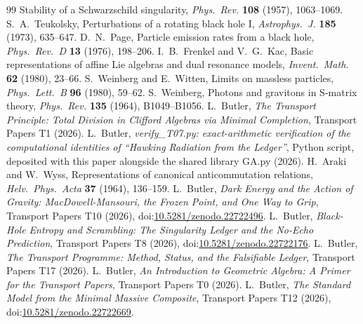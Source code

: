 \documentclass[11pt]{article}
\theoremstyle{definition}
\theoremstyle{plain}
\begin{document}
\begin{thebibliography}{99}
Stability of a Schwarzschild singularity,
\emph{Phys.\ Rev.} \textbf{108} (1957), 1063--1069.
 S.~A.~Teukolsky,
Perturbations of a rotating black hole I,
\emph{Astrophys.\ J.} \textbf{185} (1973), 635--647.
 D.~N.~Page,
Particle emission rates from a black hole,
\emph{Phys.\ Rev.\ D} \textbf{13} (1976), 198--206.
 I.~B.~Frenkel and V.~G.~Kac,
Basic representations of affine Lie algebras and dual resonance models,
\emph{Invent.\ Math.} \textbf{62} (1980), 23--66.
 S.~Weinberg and E.~Witten,
Limits on massless particles,
\emph{Phys.\ Lett.\ B} \textbf{96} (1980), 59--62.
 S.~Weinberg,
Photons and gravitons in S-matrix theory,
\emph{Phys.\ Rev.} \textbf{135} (1964), B1049--B1056.
 L.~Butler,
\emph{The Transport Principle: Total Division in Clifford Algebras via Minimal Completion},
Transport Papers T1 (2026).
 L.~Butler,
\emph{verify\_T07.py: exact-arithmetic verification of the computational identities of ``Hawking Radiation from the Ledger''},
Python script, deposited with this paper alongside the shared library GA.py (2026).
 H.~Araki and W.~Wyss,
Representations of canonical anticommutation relations,
\emph{Helv.\ Phys.\ Acta} \textbf{37} (1964), 136--159.
 L.~Butler,
\emph{Dark Energy and the Action of Gravity: MacDowell-Mansouri, the Frozen Point, and One Way to Grip},
Transport Papers T10 (2026), doi:\href{https://doi.org/10.5281/zenodo.22722496}{10.5281/zenodo.22722496}.
 L.~Butler,
\emph{Black-Hole Entropy and Scrambling: The Singularity Ledger and the No-Echo Prediction},
Transport Papers T8 (2026), doi:\href{https://doi.org/10.5281/zenodo.22722176}{10.5281/zenodo.22722176}.
 L.~Butler,
\emph{The Transport Programme: Method, Status, and the Falsifiable Ledger},
Transport Papers T17 (2026).
 L.~Butler,
\emph{An Introduction to Geometric Algebra: A Primer for the Transport Papers},
Transport Papers T0 (2026).
 L.~Butler,
\emph{The Standard Model from the Minimal Massive Composite},
Transport Papers T12 (2026), doi:\href{https://doi.org/10.5281/zenodo.22722669}{10.5281/zenodo.22722669}.
\end{thebibliography}
\end{document}
